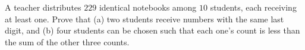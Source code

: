 A teacher distributes $229$ identical notebooks among $10$ students, each receiving at least one. Prove that (a) two students receive numbers with the same last digit, and (b) four students can be chosen such that each one's count is less than the sum of the other three counts.
